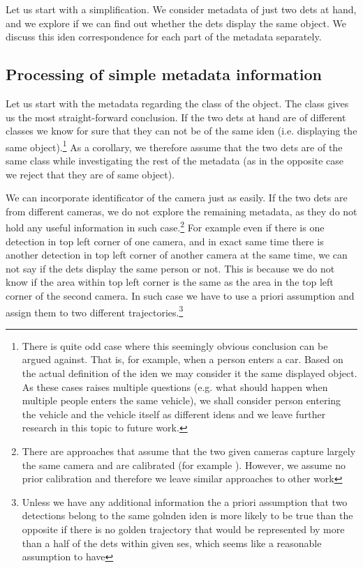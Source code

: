 Let us start with a simplification. We consider metadata of just two
\glspl{det} at hand, and we explore if we can find out whether the \glspl{det}
display the same object. We discuss this \gls{iden} correspondence for each part
of the metadata separately.

\subsection{Processing of simple metadata information}

Let us start with the metadata regarding the class of the object. The class
gives us the most straight-forward conclusion.
If the two \glspl{det} at hand are of different classes we know for sure
that they can not be of the same \gls{iden} (i.e. displaying the same
object).\footnote{There is quite
odd case where this seemingly obvious conclusion can be argued against. That
is, for example, when a person enters a car. Based on the actual definition of
the \gls{iden} we may consider it the same displayed object. As these cases
raises multiple questions (e.g. what should happen when multiple people enters the same vehicle), we shall
consider person entering the vehicle and the vehicle itself as different
\glspl{iden} and we leave further research in this topic to
future work.} As a corollary, we therefore assume that the two \glspl{det} are
of the same class while investigating the rest of the metadata (as in the
opposite case we reject that they are of same object).

We can incorporate identificator of the camera just as easily. If the two
\glspl{det} are from different cameras, we do not explore the remaining
metadata, as they do not hold any useful information in such
case.\footnote{There
are approaches that assume that the two given cameras capture largely the same
camera and are calibrated (for example \cite{hu2006principal}). However, we
assume no prior calibration and therefore we leave similar approaches to other
work} For example even if there is one detection in top left corner of one
camera, and in exact same time there is another detection in top left corner
of another camera at the same time, we can not say if the \glspl{det}
display the same person or not. This is
because we do not know if the area within top left corner is the same as the
area in the top left corner of the second camera. In such case we have to use
a priori assumption and assign them to two different
trajectories.\footnote{Unless we have any additional information the a priori
assumption that two detections belong to the same golnden \gls{iden} is more
likely to be true than the opposite if there is no
golden trajectory that would be represented by more than a half of the
\glspl{det} within given \gls{ses}, which seems like a reasonable assumption to
have}

